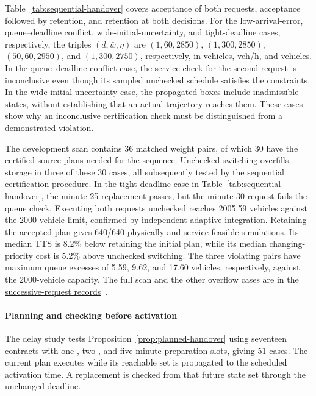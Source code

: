 \documentclass[preprint,12pt]{elsarticle}
\theoremstyle{definition}
\theoremstyle{plain}
\theoremstyle{definition}
\theoremstyle{plain}
\newcommand{\reproductiondetails}[1]{\href{https://github.com/AlienEslami/agentic-perimeter-runtime-certification/releases/tag/paper-2026-11-10}{#1}~\cite{perimeterReproductionGuide}}
\begin{document}
Table~\ref{tab:sequential-handover} covers acceptance of both requests,
acceptance followed by retention, and retention at both decisions.
For the low-arrival-error, queue--deadline conflict, wide-initial-uncertainty,
and tight-deadline cases, respectively, the triples
$(d,\bar w,\eta)$ are $(1,60,2850)$, $(1,300,2850)$,
$(50,60,2950)$, and $(1,300,2750)$, respectively, in vehicles, veh/h,
and vehicles. In the queue--deadline conflict case, the service check for
the second request is inconclusive even though its sampled unchecked schedule satisfies the
constraints. In the wide-initial-uncertainty case, the propagated boxes include inadmissible states,
without establishing that an actual trajectory reaches them. These cases
show why an inconclusive certification check must be distinguished from a
demonstrated violation.

The development scan contains 36 matched weight pairs, of which 30 have
the certified source plans needed for the sequence. Unchecked switching
overfills storage in three of these 30 cases, all subsequently tested by
the sequential certification procedure. In the tight-deadline case in Table~\ref{tab:sequential-handover},
the minute-25 replacement passes,
but the minute-30 request fails the queue check. Executing both requests
unchecked reaches 2005.59 vehicles against the 2000-vehicle limit,
confirmed by independent adaptive integration. Retaining the accepted
plan gives 640/640 physically and service-feasible simulations. Its median
TTS is 8.2\% below retaining the initial plan, while its median
changing-priority cost is 5.2\% above unchecked switching. The three violating pairs have maximum queue excesses of 5.59, 9.62,
and 17.60 vehicles, respectively, against the 2000-vehicle capacity.
The full scan and the other overflow cases are in the
\reproductiondetails{successive-request records}.



\paragraph{Planning and checking before activation}
\label{sec:delayed-handover-results}
The delay study tests Proposition~\ref{prop:planned-handover} using
seventeen contracts with one-, two-, and five-minute preparation slots,
giving 51 cases. The current plan executes while its reachable set is
propagated to the scheduled activation time. A replacement is checked
from that future state set through the unchanged deadline.
\end{document}
